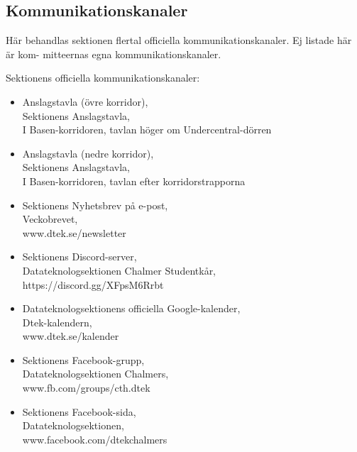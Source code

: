 \subsection{Kommunikationskanaler}
Här behandlas sektionen flertal officiella kommunikationskanaler. Ej listade här är kom-
mitteernas egna kommunikationskanaler.

Sektionens officiella kommunikationskanaler:
\begin{itemize}
    \item Anslagstavla (övre korridor),\\
    Sektionens Anslagstavla,\\
    I Basen-korridoren, tavlan höger om Undercentral-dörren

    \item Anslagstavla (nedre korridor),\\
    Sektionens Anslagstavla,\\
    I Basen-korridoren, tavlan efter korridorstrapporna

    \item Sektionens Nyhetsbrev på e-post,\\
    Veckobrevet,\\
    www.dtek.se/newsletter

    \item Sektionens Discord-server,\\
    Datateknologsektionen Chalmer Studentkår,\\
    https://discord.gg/XFpsM6Rrbt

    \item Datateknologsektionens officiella Google-kalender,\\
    Dtek-kalendern,\\
    www.dtek.se/kalender

    \item Sektionens Facebook-grupp,\\
    Datateknologsektionen Chalmers,\\
    www.fb.com/groups/cth.dtek

    \item Sektionens Facebook-sida,\\
    Datateknologsektionen,\\
    www.facebook.com/dtekchalmers

\end{itemize}
